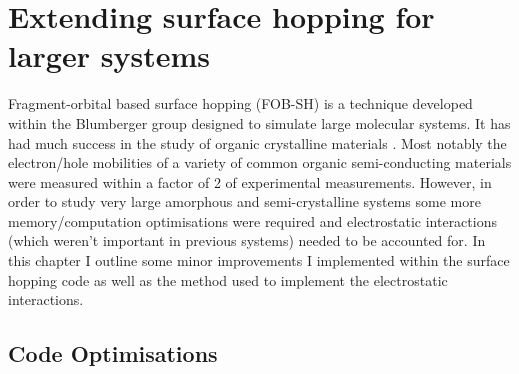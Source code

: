 \chapter{Extending surface hopping for larger systems}
\label{chap:surface_hopping_ext}
Fragment-orbital based surface hopping (FOB-SH) is a technique developed within the Blumberger group \cite{spencer_fob-sh:_2016} designed to simulate large molecular systems. It has had much success in the study of organic crystalline materials \cite{giannini_crossover_2018, carof_detailed_2017}. Most notably the electron/hole mobilities of a variety of common organic semi-conducting materials were measured within a factor of 2 of experimental measurements. However, in order to study very large amorphous and semi-crystalline systems some more memory/computation optimisations were required and electrostatic interactions (which weren't important in previous systems) needed to be accounted for. In this chapter I outline some minor improvements I implemented within the surface hopping code as well as the method used to implement the electrostatic interactions.

\section{Code Optimisations}
